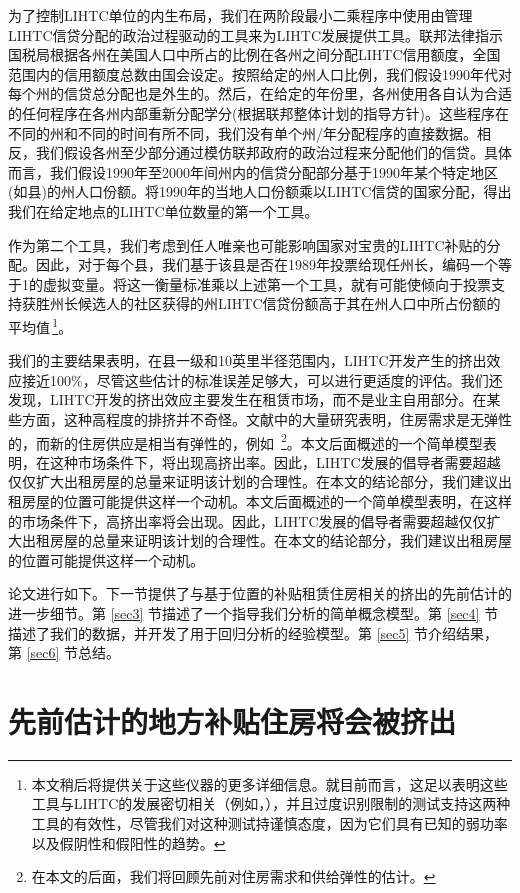 \documentclass[lang=cn,11pt,a4paper]{paper}
\begin{document}
为了控制LIHTC单位的内生布局，我们在两阶段最小二乘程序中使用由管理LIHTC信贷分配的政治过程驱动的工具来为LIHTC发展提供工具。联邦法律指示国税局根据各州在美国人口中所占的比例在各州之间分配LIHTC信用额度，全国范围内的信用额度总数由国会设定。按照给定的州人口比例，我们假设1990年代对每个州的信贷总分配也是外生的。然后，在给定的年份里，各州使用各自认为合适的任何程序在各州内部重新分配学分(根据联邦整体计划的指导方针)。这些程序在不同的州和不同的时间有所不同，我们没有单个州/年分配程序的直接数据。相反，我们假设各州至少部分通过模仿联邦政府的政治过程来分配他们的信贷。具体而言，我们假设1990年至2000年间州内的信贷分配部分基于1990年某个特定地区(如县)的州人口份额。将1990年的当地人口份额乘以LIHTC信贷的国家分配，得出我们在给定地点的LIHTC单位数量的第一个工具。

作为第二个工具，我们考虑到任人唯亲也可能影响国家对宝贵的LIHTC补贴的分配。因此，对于每个县，我们基于该县是否在1989年投票给现任州长，编码一个等于1的虚拟变量。将这一衡量标准乘以上述第一个工具，就有可能使倾向于投票支持获胜州长候选人的社区获得的州LIHTC信贷份额高于其在州人口中所占份额的平均值\,\footnote{本文稍后将提供关于这些仪器的更多详细信息。就目前而言，这足以表明这些工具与LIHTC的发展密切相关（例如，\citep{Stock200580,Murray2006111}），并且过度识别限制的测试支持这两种工具的有效性，尽管我们对这种测试持谨慎态度，因为它们具有已知的弱功率以及假阴性和假阳性的趋势。}。

我们的主要结果表明，在县一级和10英里半径范围内，LIHTC开发产生的挤出效应接近100\%，尽管这些估计的标准误差足够大，可以进行更适度的评估。我们还发现，LIHTC开发的挤出效应主要发生在租赁市场，而不是业主自用部分。在某些方面，这种高程度的排挤并不奇怪。文献中的大量研究表明，住房需求是无弹性的，而新的住房供应是相当有弹性的，例如 \cite{Hanushek1980449}\,\footnote{在本文的后面，我们将回顾先前对住房需求和供给弹性的估计。}。本文后面概述的一个简单模型表明，在这种市场条件下，将出现高挤出率。因此，LIHTC发展的倡导者需要超越仅仅扩大出租房屋的总量来证明该计划的合理性。在本文的结论部分，我们建议出租房屋的位置可能提供这样一个动机。本文后面概述的一个简单模型表明，在这样的市场条件下，高挤出率将会出现。因此，LIHTC发展的倡导者需要超越仅仅扩大出租房屋的总量来证明该计划的合理性。在本文的结论部分，我们建议出租房屋的位置可能提供这样一个动机。

论文进行如下。下一节提供了与基于位置的补贴租赁住房相关的挤出的先前估计的进一步细节。第 \ref{sec3} 节描述了一个指导我们分析的简单概念模型。第 \ref{sec4} 节描述了我们的数据，并开发了用于回归分析的经验模型。第 \ref{sec5} 节介绍结果，第 \ref{sec6} 节总结。

\section{先前估计的地方补贴住房将会被挤出}
\end{document}
